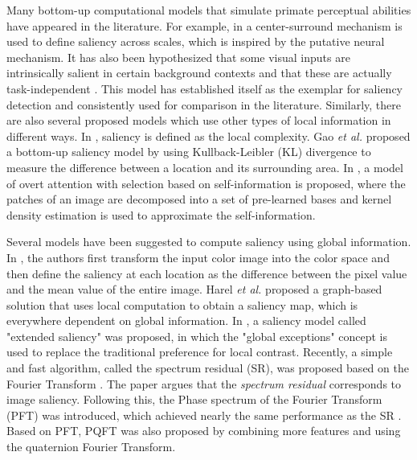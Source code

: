 \documentclass[10pt,journal,cspaper,compsoc]{IEEEtran}
\begin{document}
Many bottom-up computational models that simulate primate perceptual abilities have appeared in the literature. For example, in \cite{Itti_etal98pami, Itti_Koch01nrn, itti2000saliency} a center-surround mechanism is used to define saliency across scales, which is inspired by the putative neural mechanism. It has also been hypothesized that some visual inputs are intrinsically salient in certain background contexts and that these are actually task-independent \cite{Itti_etal98pami, Itti_Koch01nrn}. This model has established itself as the exemplar for saliency detection and consistently used for comparison in the literature. Similarly, there are also several proposed models which use other types of local information in different ways. In \cite{kadir2001saliency}, saliency is defined as the local complexity. Gao {\it et al.} \cite{gao2009discriminant,gao2007bottom,gao2008plausibility} proposed a bottom-up saliency model by using Kullback-Leibler (KL) divergence to measure the difference between a location and its surrounding area. In \cite{NIPS2005_81}, a model of overt attention with selection based on self-information is proposed, where the patches of an image are decomposed into a set of pre-learned bases and kernel density estimation is used to approximate the self-information.

Several models have been suggested to compute saliency using global information. In \cite{LCAV-CONF-2009-012}, the authors first transform the input color image into the  color space and then define the saliency at each location as the difference between the  pixel value and the mean  value of the entire image. Harel {\it et al.} \cite{NIPS2006_897} proposed a graph-based solution that uses local computation to obtain a saliency map, which is everywhere dependent on global information. In \cite{avraham2009esaliency}, a saliency model called "extended saliency" was proposed, in which the "global exceptions" concept is used to replace the traditional preference for local contrast. Recently, a simple and fast algorithm, called the spectrum residual (SR), was proposed based on the Fourier Transform \cite{hou2007saliency}. The paper argues that the {\it spectrum residual} corresponds to image saliency. Following this, the Phase spectrum of the Fourier Transform (PFT) was introduced, which achieved nearly the same performance as the SR \cite{guo2008spatio}. Based on PFT, PQFT \cite{guo2008spatio} was also proposed by combining more features and using the quaternion Fourier Transform.
\end{document}
